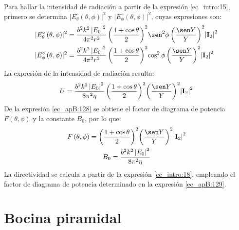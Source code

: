 Para hallar la intensidad de radiación a partir de la expresión \eqref{ec_intro:15}, primero se determina $\lvert E_{\theta}^{\circ}\left(\theta,\phi\right)\rvert^2$ y $\lvert E_{\phi}^{\circ}\left(\theta,\phi\right)\vert^2$, cuyas expresiones son:
\begin{subequations}
\label{grup_ec_apB:23}
\begin{align}
\lvert E_{\theta}^{\circ}\left(\theta,\phi\right)\rvert^2 &= \frac{b^2k^2\left|E_0\right|^2}{4\pi^2 r^2}\left(\dfrac{1 + \cos\theta}{2}\right)^2\!\sen^2\phi\left(\frac{\sen Y}{Y}\right)^2\!{\lvert\mathbf{I}_2\rvert}^2
\label{ec_apB:126}\\
\lvert E_{\phi}^{\circ}\left(\theta,\phi\right)\rvert^2 &= \frac{b^2k^2\left|E_0\right|^2}{4\pi^2 r^2}\left(\dfrac{1 + \cos\theta}{2}\right)^2\!\cos^2\phi\left(\frac{\sen Y}{Y}\right)^2\!{\lvert\mathbf{I}_2\rvert}^2
\label{ec_apB:127}
\end{align}
\end{subequations}
La expresión de la intensidad de radiación resulta:
\begin{align}
U = \frac{b^2k^2\left|E_0\right|^2}{8\pi^2\eta}\left(\dfrac{1 + \cos\theta}{2}\right)^2\!\left(\frac{\sen Y}{Y}\right)^2\!{\lvert\mathbf{I}_2\rvert}^2
\label{ec_apB:128}
\end{align}
De la expresión \eqref{ec_apB:128} se obtiene el factor de diagrama de potencia $F\left(\theta,\phi\right)$ y la constante $B_0$, por lo que:
\begin{gather}
F\left(\theta,\phi\right) = \left(\dfrac{1 + \cos\theta}{2}\right)^2\!\left(\frac{\sen Y}{Y}\right)^2\!{\lvert\mathbf{I}_2\rvert}^2
\label{ec_apB:129}\\
B_0 = \frac{b^2k^2\left|E_0\right|^2}{8\pi^2\eta}
\label{ec_apB:130}
\end{gather}
La directividad se calcula a partir de la expresión \eqref{ec_intro:18}, empleando el factor de diagrama de potencia determinado en la expresión \eqref{ec_apB:129}.

\section{Bocina piramidal}
\label{sec_apendice_b_boci_pira}

